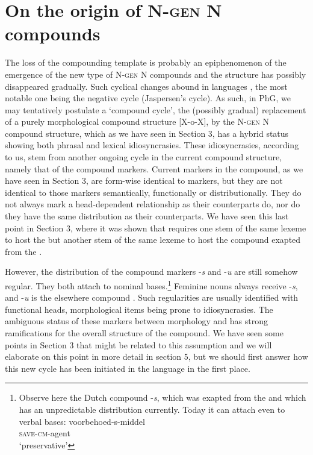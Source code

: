 \documentclass[output=paper]{LSP/langsci}
\begin{document}
\section{On the origin of N-\textsc{gen} N compounds}
The loss of the  compounding template is probably an epiphenomenon of the emergence of the new type of N-\textsc{gen} N compounds and the structure has possibly disappeared gradually. Such cyclical changes abound in languages \citep{vanGelderen2011}, the most notable one being the negative cycle (Jaspersen's cycle). As such, in PhG, we may tentatively postulate a `compound cycle', the (possibly gradual) replacement of a purely morphological compound structure [X-o-X], by the N-\textsc{gen} N compound structure, which as we have seen in Section 3, has a hybrid status showing both phrasal and lexical idiosyncrasies. These idiosyncrasies, according to us, stem from another ongoing cycle in the current compound structure, namely that of the compound markers. Current markers in the compound, as we have seen in Section 3, are form-wise identical to  markers, but they are not identical to those markers semantically, functionally or distributionally. They do not always mark a head-dependent relationship as their  counterparts do, nor do they have the same distribution as  their  counterparts. We have seen this last point in Section 3, where it was shown that  requires one stem of the same lexeme to host the  but another stem of the same lexeme to host the compound  exapted from the . 

However, the distribution of the compound markers -\textit{s} and -\textit{u} are still somehow regular. They both attach to nominal bases.\footnote{Observe here the Dutch compound  -\textit{s}, which was exapted from the   \citep{Booij1992} and which has an unpredictable distribution currently. Today it can attach even to verbal bases:
\ea\label{ex:16i}
	\gll voorbehoed-s-middel\\
			\textsc{save-cm}-agent\\
	\glt `preservative'
\z 
} Feminine nouns always receive -\textit{s}, and -\textit{u} is the elsewhere compound . Such regularities are usually identified with functional heads, morphological items being prone to idiosyncrasies. The ambiguous status of these markers between morphology and  has strong ramifications for the overall structure of the compound. We have seen some points in Section 3 that might be related to this assumption and we will elaborate on this point in more detail in section 5, but we should first answer how this new cycle has been initiated in the language in the first place. 
\end{document}

